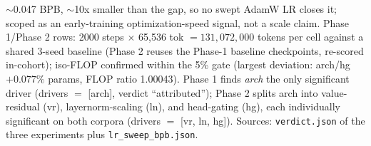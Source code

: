 \begin{table}[t]
{$\sim$0.047 BPB, $\sim$10x smaller than the gap, so no swept AdamW LR closes
it; scoped as an early-training optimization-speed signal, not a scale
claim. Phase 1/Phase 2 rows: 2000 steps $\times$ 65{,}536 tok
$= 131{,}072{,}000$ tokens per cell against a shared 3-seed baseline
(Phase 2 reuses the Phase-1 baseline checkpoints, re-scored in-cohort);
iso-FLOP confirmed within the 5\% gate (largest deviation: arch/hg
$+0.077\%$ params, FLOP ratio 1.00043). Phase 1 finds \emph{arch} the only
significant driver (drivers $=$ [arch], verdict ``attributed''); Phase 2
splits arch into value-residual (vr), layernorm-scaling (ln), and
head-gating (hg), each individually significant on both corpora (drivers
$=$ [vr, ln, hg]). Sources: \texttt{verdict.json} of the three experiments
plus \texttt{lr\_sweep\_bpb.json}.}
\label{tab:attrib}
\end{table}
